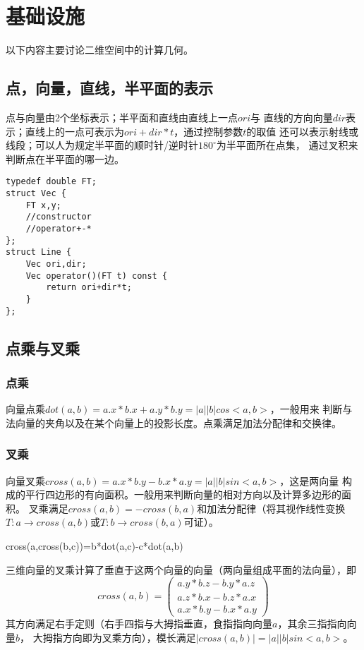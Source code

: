 \section{基础设施}
以下内容主要讨论二维空间中的计算几何。
\subsection{点，向量，直线，半平面的表示}
点与向量由2个坐标表示；半平面和直线由直线上一点$ori$与
直线的方向向量$dir$表示；直线上的一点可表示为$ori+dir*t$，通过控制参数$t$的取值
还可以表示射线或线段；可以人为规定半平面的顺时针/逆时针$180^\circ$为半平面所在点集，
通过叉积来判断点在半平面的哪一边。
\begin{lstlisting}
typedef double FT;
struct Vec {
    FT x,y;
    //constructor
    //operator+-*
};
struct Line {
    Vec ori,dir;
    Vec operator()(FT t) const {
        return ori+dir*t;
    }
};
\end{lstlisting}
\subsection{点乘与叉乘}
\subsubsection{点乘}
向量点乘$dot(a,b)=a.x*b.x+a.y*b.y=|a||b|cos<a,b>$，一般用来
判断与法向量的夹角以及在某个向量上的投影长度。点乘满足加法分配律和交换律。
\subsubsection{叉乘}
向量叉乘$cross(a,b)=a.x*b.y-b.x*a.y=|a||b|sin<a,b>$，这是两向量
构成的平行四边形的有向面积。一般用来判断向量的相对方向以及计算多边形的面积。
叉乘满足$cross(a,b)=-cross(b,a)$和加法分配律（将其视作线性变换
$T:a\rightarrow cross(a,b)$或$T:b\rightarrow cross(b,a)$可证）。

\begin{theorem}[拉格朗日公式]
	cross(a,cross(b,c))=b*dot(a,c)-c*dot(a,b)
\end{theorem}

三维向量的叉乘计算了垂直于这两个向量的向量（两向量组成平面的法向量），即
\begin{displaymath}
	cross(a,b)=\left(\begin{array}{c}
		a.y*b.z-b.y*a.z \\
		a.z*b.x-b.z*a.x \\
		a.x*b.y-b.x*a.y
	\end{array}\right)
\end{displaymath}
其方向满足右手定则（右手四指与大拇指垂直，食指指向向量$a$，其余三指指向向量$b$，
大拇指方向即为叉乘方向），模长满足$|cross(a,b)|=|a||b|sin<a,b>$。
